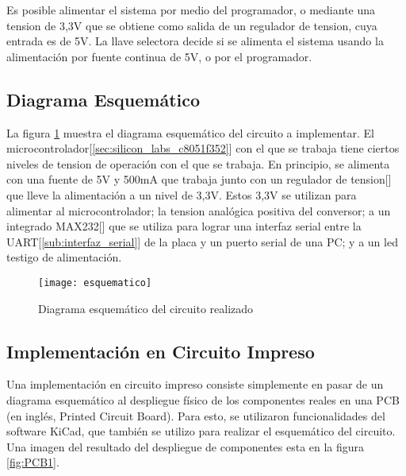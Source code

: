 Es posible alimentar el sistema por medio del programador, o mediante una tension de 3,3V que se obtiene como salida de un regulador de tension, cuya entrada es de 5V. La llave selectora decide si se alimenta el sistema usando la alimentación por fuente continua de 5V, o por el programador.




\subsection{Diagrama Esquemático} %
\label{sub:diagrama_esquematico}

La figura \ref{fig:esquematico} muestra el diagrama esquemático del circuito a implementar. El microcontrolador[\ref{sec:silicon_labs_c8051f352}] con el que se trabaja tiene ciertos niveles de tension de operación con el que se trabaja. En principio, se alimenta con una fuente de 5V y 500mA que trabaja junto con un regulador de tension[\cite{bib:lm2937}] que lleve la alimentación a un nivel de 3,3V. Estos 3,3V se utilizan para alimentar al microcontrolador; la tension analógica positiva del conversor; a un integrado MAX232[\cite{bib:max232}] que se utiliza para lograr una interfaz serial entre la UART[\ref{sub:interfaz_serial}] de la placa y un puerto serial de una PC; y a un led testigo de alimentación.

\begin{figure}[/h]
  \centering
  \texttt{[image: esquematico]}
  \caption{\small Diagrama esquemático del circuito realizado}\label{fig:esquematico}
\end{figure}



\subsection{Implementación en Circuito Impreso} %
\label{sub:implementacion_en_circuito_impreso}

Una implementación en circuito impreso consiste simplemente en pasar de un diagrama esquemático al despliegue físico de los componentes reales en una PCB (en inglés, Printed Circuit Board). Para esto, se utilizaron funcionalidades del software KiCad, que también se utilizo para realizar el esquemático del circuito. Una imagen del resultado del despliegue de componentes esta en la figura \ref{fig:PCB1}.

